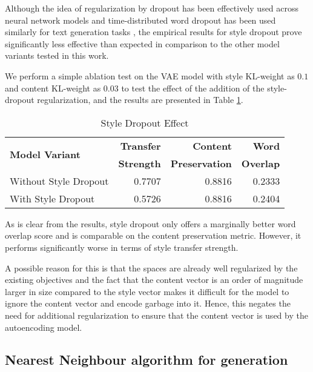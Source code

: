 Although the idea of regularization by dropout \citep{srivastava2014dropout} has been effectively used across neural network models and time-distributed word dropout has been used similarly for text generation tasks \citep{dai2015semi, bowman2016generating}, the empirical results for style dropout prove significantly less effective than expected in comparison to the other model variants tested in this work.

We perform a simple ablation test on the VAE model with style KL-weight as $0.1$ and content KL-weight as $0.03$ to test the effect of the addition of the style-dropout regularization, and the results are presented in Table \ref{tab:style-dropout-results}.

\begin{table}[ht]
	\centering
	\begin{tabular}{| l | r | r | r |}
		\hline
		\multirow{2}{*}{
		\textbf{Model Variant}} & \textbf{Transfer} & \textbf{Content}      & \textbf{Word}    \\
		                        & \textbf{Strength} & \textbf{Preservation} & \textbf{Overlap} \\
		\hline
		\hline
		Without Style Dropout   & 0.7707            & 0.8816                & 0.2333           \\
		\hline
		With Style Dropout      & 0.5726            & 0.8816                & 0.2404           \\
		\hline
	\end{tabular}
	\caption{Style Dropout Effect}
	\label{tab:style-dropout-results}
\end{table}

As is clear from the results, style dropout only offers a marginally better word overlap score and is comparable on the content preservation metric. However, it performs significantly worse in terms of style transfer strength.

A possible reason for this is that the spaces are already well regularized by the existing objectives and the fact that the content vector is an order of magnitude larger in size compared to the style vector makes it difficult for the model to ignore the content vector and encode garbage into it. Hence, this negates the need for additional regularization to ensure that the content vector is used by the autoencoding model.

\subsection{Nearest Neighbour algorithm for generation}

